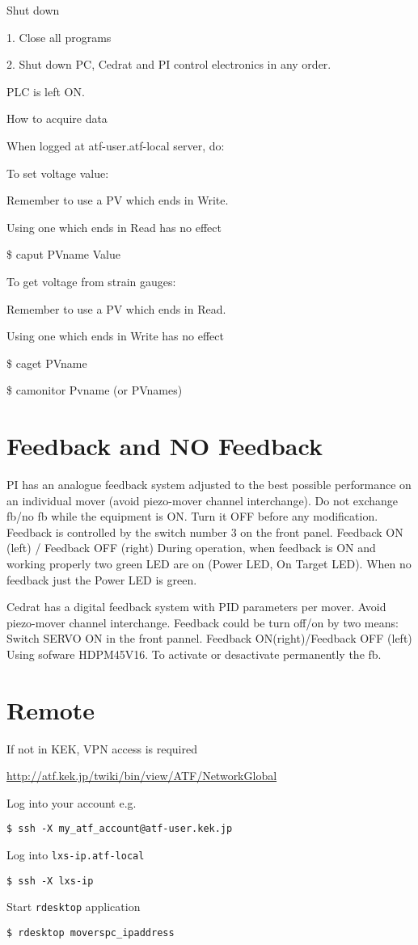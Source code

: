 Shut down\par
1. Close all programs\par
2. Shut down PC, Cedrat and PI control electronics in any order.\par
PLC is left ON.\par
How to acquire data\par
When logged at atf-user.atf-local server, do:\par
To set voltage value:\par
Remember to use a PV which ends in Write.\par
Using one which ends in Read has no effect\par
\$ caput PVname Value\par
To get voltage from strain gauges:\par
Remember to use a PV which ends in Read.\par
Using one which ends in Write has no effect\par
\$ caget PVname\par
\$ camonitor Pvname (or PVnames)\par

\section{Feedback and NO Feedback}
PI has an analogue feedback system adjusted to the best possible performance on an individual mover (avoid piezo-mover channel interchange). Do not exchange fb/no fb while the equipment is ON. Turn it OFF before any modification. 
Feedback is controlled by the switch number 3  on the front panel. 
Feedback ON (left) / Feedback OFF (right)
During operation, when feedback is ON and working properly two green LED are on (Power LED, On Target LED). When no feedback just the Power LED is green.

Cedrat has a digital feedback system with PID parameters per mover. Avoid piezo-mover channel interchange. Feedback could be turn off/on by two means:
Switch SERVO ON in the front pannel. Feedback ON(right)/Feedback OFF (left)
Using sofware  HDPM45V16. To activate or desactivate permanently the fb.\par 

\section{Remote}
If not in KEK, VPN access is required\par
\url{http://atf.kek.jp/twiki/bin/view/ATF/NetworkGlobal}\par
Log into your account e.g.\par
\verb?$ ssh -X my_atf_account@atf-user.kek.jp?\par
Log into \verb?lxs-ip.atf-local?\par
\verb?$ ssh -X lxs-ip?\par
Start \verb?rdesktop? application\par
\verb?$ rdesktop moverspc_ipaddress?

